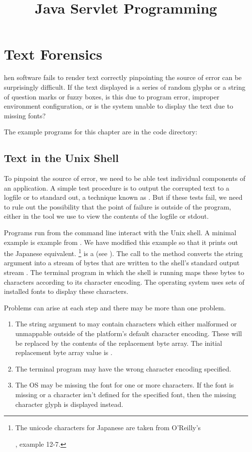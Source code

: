 \chapter{Text Forensics}\label{chap:forensics}

hen software fails to render text correctly
pinpointing the source of error can be surprisingly difficult.
If the text displayed is a series of random glyphs or a string of
question marks or fuzzy boxes, is this due to program error,
improper environment configuration, or is the system unable to
display the text due to missing fonts?

The example programs for this chapter are in the code directory:
%



\section{Text in the Unix Shell}

To pinpoint the source of error, we need to be able test individual
components of an application.
A simple test procedure is to output the corrupted text
to a logfile or to standard out, a technique known as .
But if these tests fail, we need to rule out the possibility that the point of
failure is outside of the program, either in the tool we use to view the
contents of the logfile or stdout.

Programs run from the command line interact with the Unix shell.
A minimal example is  example from .
We have modified this example so that it prints out the Japanese equivalent.%
%
\footnote{The unicode characters for Japanese are taken from
O'Reilly's \title{Java Servlet Programming}, example 12-7.}
%
%
 is a  (see ).
The call to the  method converts the string argument into 
a stream of bytes that are written to the shell's standard output stream .
The terminal program in which the shell is running maps 
these bytes to characters according to its character encoding.
The operating system uses sets of installed fonts to display these characters.

Problems can arise at each step and there may be more than one problem.
\begin{enumerate}
\item The string argument to  may contain characters which 
either malformed or unmappable outside of the platform's default character encoding.
These will be replaced by the contents of the replacement byte array.
The initial replacement byte array value is .
\item The terminal program may have the wrong character encoding specified.
\item The OS may be missing the font for one or more characters.
If the font is missing or a character isn't defined for the specified font,
then the missing character glyph is displayed instead.
\end{enumerate}



